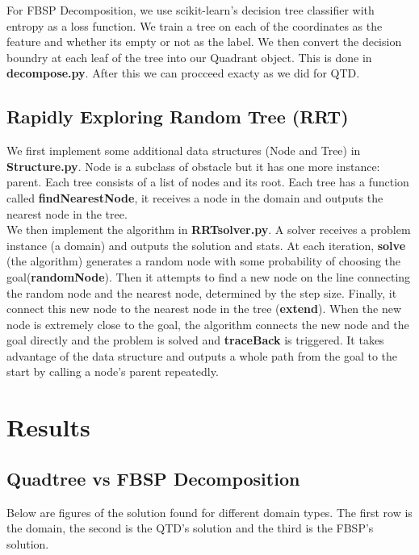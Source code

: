 \documentclass[12pt,a4paper]{article}
\begin{document}
For FBSP Decomposition, we use scikit-learn's decision tree classifier with entropy as a loss function. We train 
a tree on each of the coordinates as the feature and 
whether its empty or not as the label. We then convert
the decision boundry at each leaf of the tree into our
Quadrant object. This is done in \textbf{decompose.py}. After this we can procceed exacty as we did for QTD.

\subsection{Rapidly Exploring Random Tree (RRT)}
We first implement some additional data structures (Node and Tree) in \textbf{Structure.py}. Node is a subclass of obstacle but it has one more instance: parent. Each tree consists of a list of nodes and its root. Each tree has a function called \textbf{findNearestNode}, it receives a node in the domain and outputs the nearest node in the tree.\\

We then implement the algorithm in \textbf{RRTsolver.py}. A solver receives a problem instance (a domain) and outputs the solution and stats. At each iteration, \textbf{solve} (the algorithm) generates a random node with some probability of choosing the goal(\textbf{randomNode}). Then it attempts to find a new node on the line connecting the random node and the nearest node, determined by the step size. Finally, it connect this new node to the nearest node in the tree (\textbf{extend}). When the new node is extremely close to the goal, the algorithm connects the new node and the goal directly and the problem is solved and \textbf{traceBack} is triggered. It takes advantage of the data structure and outputs a whole path from the goal to the start by calling a node's parent repeatedly. 

\section{Results}
\subsection{Quadtree vs FBSP Decomposition}

Below are figures of the solution found for different
domain types. The first row is the domain, the second is the QTD's solution
and the third is the FBSP's solution.\\

\newpage
\end{document}
